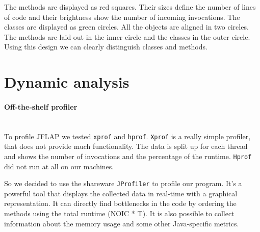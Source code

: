\documentclass{paper}
\begin{document}
The methods are displayed as red squares. Their sizes define the number of lines of code and their brightness show the number of incoming invocations. The classes are displayed as green circles. All the objects are aligned in two circles. The methods are laid out in the inner circle and the classes in the outer circle. Using this design we can clearly distinguish classes and methods.

\section{Dynamic analysis}


\paragraph{Off-the-shelf profiler}\mbox{}\vspace{10pt}\\
To profile JFLAP we tested \texttt{xprof} and \texttt{hprof}. \texttt{Xprof} is a really simple profiler, that does not provide much functionality. The data is split up for each thread and shows the number of invocations and the percentage of the runtime. \texttt{Hprof} did not run at all on our machines.

So we decided to use the shareware \texttt{JProfiler} to profile our program. It's a powerful tool that displays the collected data in real-time with a graphical representation. It can directly find bottlenecks in the code by ordering the methods using the total runtime (NOIC * T). It is also possible to collect information about the memory usage and some other Java-specific metrics.
\end{document}
